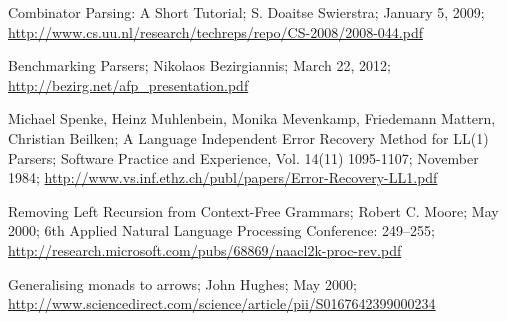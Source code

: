 \begin{thebibliography}{99}
\begin{multicols}{2}
  Combinator Parsing: A Short Tutorial;
  S. Doaitse Swierstra;
  January 5, 2009;
  \url{http://www.cs.uu.nl/research/techreps/repo/CS-2008/2008-044.pdf}
  
	Benchmarking Parsers;
	Nikolaos Bezirgiannis;
	March 22, 2012;
	\url{http://bezirg.net/afp_presentation.pdf}

	Michael Spenke, Heinz Muhlenbein, Monika Mevenkamp, Friedemann Mattern, Christian Beilken;
	A Language Independent Error Recovery Method for LL(1) Parsers;
	Software Practice and Experience, Vol. 14(11) 1095-1107;
	November 1984;
	\url{http://www.vs.inf.ethz.ch/publ/papers/Error-Recovery-LL1.pdf}

	Removing Left Recursion from Context-Free Grammars;
	Robert C. Moore;
	May 2000;
	6th Applied Natural Language Processing Conference: 249–255;
	\url{http://research.microsoft.com/pubs/68869/naacl2k-proc-rev.pdf}

	Generalising monads to arrows;
	John Hughes;
	May 2000;
	\url{http://www.sciencedirect.com/science/article/pii/S0167642399000234}

\end{multicols}

\end{thebibliography}